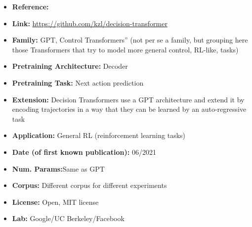 \documentclass{article}
\begin{document}
            \begin{itemize}
                \item \textbf{Reference:} \href{https://arxiv.org/abs/2106.01345}{}
                \item \textbf{Link:} \url{https://github.com/kzl/decision-transformer}
                \item \textbf{Family:} GPT, Control Transformers” (not per se a family, but grouping here those Transformers that try to model more general control, RL-like, tasks) 
                \item \textbf{Pretraining Architecture:} Decoder
                \item \textbf{Pretraining Task:} Next action prediction
                \item \textbf{Extension:} Decision Transformers use a GPT architecture and extend it by encoding trajectories in a way that they can be learned by an auto-regressive task  
                \item \textbf{Application:} General RL (reinforcement learning tasks)
                \item \textbf{Date (of first known publication):} 06/2021
                \item \textbf{Num. Params:}Same as GPT
                \item \textbf{Corpus:} Different corpus for different experiments
                \item \textbf{License:} Open, MIT license
                \item \textbf{Lab:} Google/UC Berkeley/Facebook
            \end{itemize}
\end{document}
